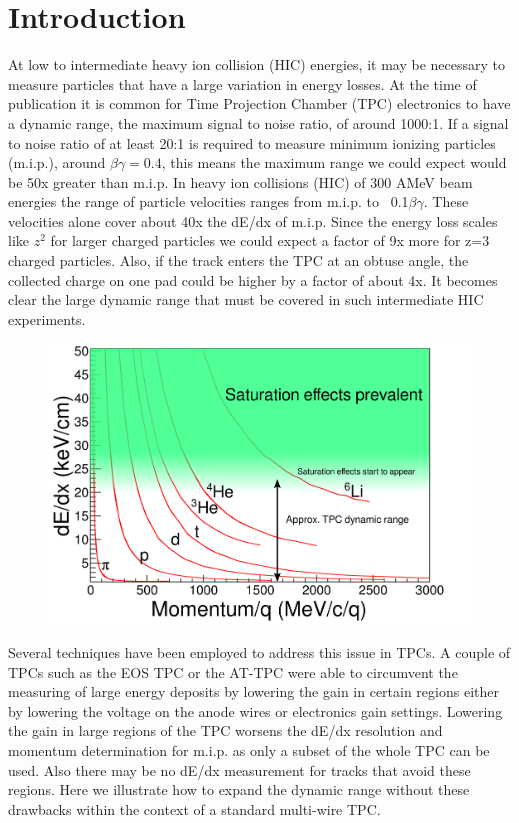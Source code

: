 \documentclass[review]{elsarticle}
\begin{document}
\linenumbers

\section{Introduction} 
 At low to intermediate heavy ion collision (HIC) energies, it may be necessary to measure particles that have a large variation in energy losses. At the time of publication it is common for Time Projection Chamber (TPC) electronics to have a dynamic range, the maximum signal to noise ratio, of around 1000:1. If a signal to noise ratio of at least 20:1 is required to measure minimum ionizing particles (m.i.p.), around $\beta\gamma=0.4$, this means the maximum range we could expect would be 50x greater than m.i.p.  In heavy ion collisions (HIC) of 300 AMeV beam energies the range of particle velocities ranges from m.i.p. to ~0.1$\beta\gamma$. These velocities alone cover about 40x the dE/dx of m.i.p. Since the energy loss scales like $z^2$ for larger charged particles we could expect a factor of 9x more for z=3 charged particles. Also, if the track enters the TPC at an obtuse angle, the collected charge on one pad could be higher by a factor of about 4x.  It becomes clear the large dynamic range that must be covered in such intermediate HIC experiments. 
 
 \begin{figure}[H]
\includegraphics[width=\linewidth]{intrographic}
\caption{}
\label{fig:intro}
\end{figure}

Several techniques have been employed to address this issue in TPCs. A couple of TPCs such as the EOS TPC \cite{eos} or the AT-TPC were able to circumvent the measuring of large energy deposits by lowering the gain in certain regions either by lowering the voltage on the anode wires or electronics gain settings. Lowering the gain in large regions of the TPC worsens the dE/dx resolution and momentum determination for m.i.p. as only a subset of the whole TPC can be used. Also there may be no dE/dx measurement for tracks that avoid these regions. Here we illustrate how to expand the dynamic range without these drawbacks within the context of a standard multi-wire TPC. 
\end{document}
